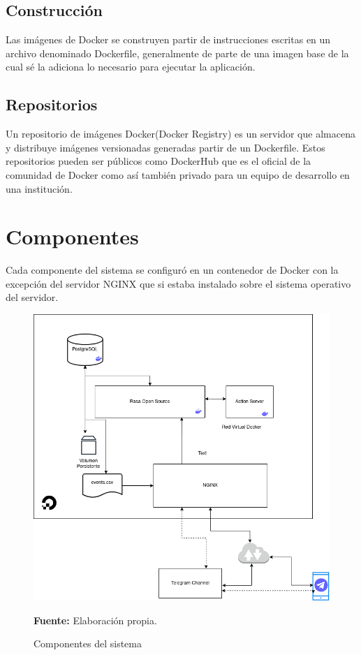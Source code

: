 \subsection{Construcción}
Las imágenes de Docker se construyen partir de instrucciones escritas en un archivo denominado
Dockerfile,
generalmente de parte de una imagen base de la cual sé la adiciona lo necesario para ejecutar la
aplicación.
\cite{Docker}

\subsection{Repositorios}
Un repositorio de imágenes Docker(Docker Registry) es un servidor que almacena y distribuye
imágenes versionadas generadas partir de un Dockerfile. Estos repositorios pueden ser públicos como
DockerHub que es el oficial de la comunidad de Docker como así también privado para un equipo de
desarrollo en una institución.
\cite{Docker}

\section{Componentes}

Cada componente del sistema se configuró en un contenedor de Docker con la excepción del servidor
NGINX que si estaba instalado sobre el sistema operativo del servidor.
\begin{figure}[ht]
	\centering
	\includegraphics[width=\textwidth]{imagenes/cap4/server.png}
	\caption{Componentes del sistema}
	\textbf{Fuente:} Elaboración propia.
	\label{fig:server_diagram}
\end{figure}

